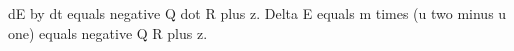 dE by dt equals negative Q dot R plus z. Delta E equals m times (u two minus u one) equals negative Q R plus z.